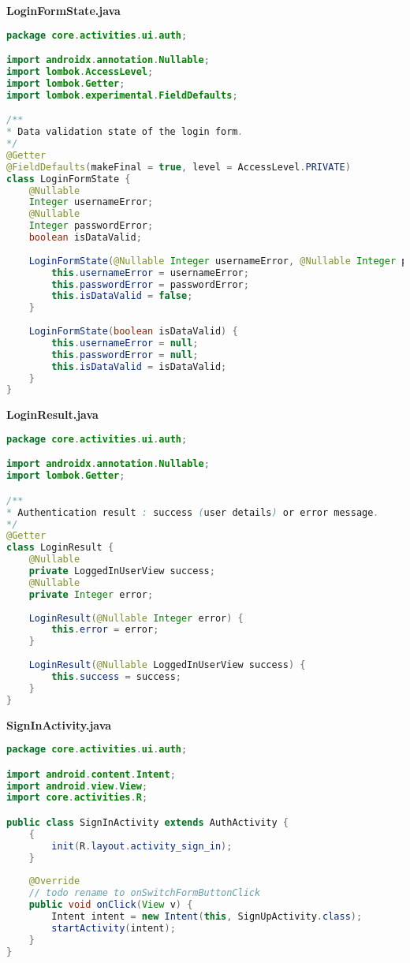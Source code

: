 \textbf{LoginFormState.java}
\begin{lstlisting}[language=Java]
package core.activities.ui.auth;

import androidx.annotation.Nullable;
import lombok.AccessLevel;
import lombok.Getter;
import lombok.experimental.FieldDefaults;

/**
* Data validation state of the login form.
*/
@Getter
@FieldDefaults(makeFinal = true, level = AccessLevel.PRIVATE)
class LoginFormState {
	@Nullable
	Integer usernameError;
	@Nullable
	Integer passwordError;
	boolean isDataValid;
	
	LoginFormState(@Nullable Integer usernameError, @Nullable Integer passwordError) {
		this.usernameError = usernameError;
		this.passwordError = passwordError;
		this.isDataValid = false;
	}
	
	LoginFormState(boolean isDataValid) {
		this.usernameError = null;
		this.passwordError = null;
		this.isDataValid = isDataValid;
	}
}	
\end{lstlisting}

\textbf{LoginResult.java}
\begin{lstlisting}[language=Java]
package core.activities.ui.auth;

import androidx.annotation.Nullable;
import lombok.Getter;

/**
* Authentication result : success (user details) or error message.
*/
@Getter
class LoginResult {
	@Nullable
	private LoggedInUserView success;
	@Nullable
	private Integer error;
	
	LoginResult(@Nullable Integer error) {
		this.error = error;
	}
	
	LoginResult(@Nullable LoggedInUserView success) {
		this.success = success;
	}
}	
\end{lstlisting}

\textbf{SignInActivity.java}
\begin{lstlisting}[language=Java]
package core.activities.ui.auth;

import android.content.Intent;
import android.view.View;
import core.activities.R;

public class SignInActivity extends AuthActivity {
	{
		init(R.layout.activity_sign_in);
	}
	
	@Override
	// todo rename to onSwitchFormButtonClick
	public void onClick(View v) {
		Intent intent = new Intent(this, SignUpActivity.class);
		startActivity(intent);
	}
}
	
\end{lstlisting}

